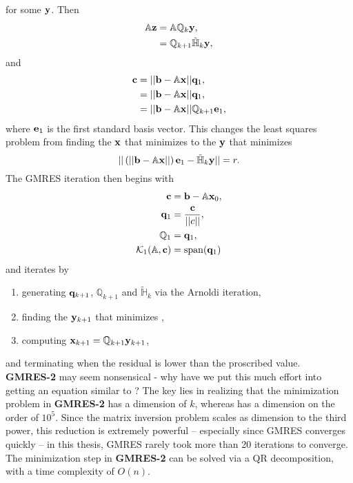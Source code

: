 for some $\mathbf{y}$. Then 
\begin{align}
\begin{split}
\mathbb{A}\mathbf{z} &= \mathbb{A}\mathbb{Q}_{k}\mathbf{y},\\
				&= \mathbb{Q}_{k+1}\mathbb{\tilde{H}}_{k}\mathbf{y},
\end{split}
\end{align}
and
\begin{align} 
\begin{split}
\mathbf{c} &= ||\mathbf{b} - \mathbb{A}\mathbf{x}||\mathbf{q}_1, \\
	&= ||\mathbf{b} - \mathbb{A}\mathbf{x}||\mathbf{q}_1,\\
	&= ||\mathbf{b} - \mathbb{A}\mathbf{x}||\mathbb{Q}_{k+1}\mathbf{e}_1,
\end{split}
\end{align}
where $\mathbf{e}_1$ is the first standard basis vector. This changes the least squares problem from finding the $\mathbf{x}$ that minimizes  to the $\mathbf{y}$ that minimizes
\begin{equation}\label{eq:GMRESMIN}
|| \left ( ||\mathbf{b} - \mathbb{A}\mathbf{x}|| \right )\mathbf{e}_1 - \mathbb{\tilde{H}}_k \mathbf{y} || = r.
\end{equation}
 The GMRES iteration then begins with 
 \begin{align*}
 \mathbf{c} &= \mathbf{b} - \mathbb{A}\mathbf{x}_0,\\
  \mathbf{q}_1 &= \dfrac{\mathbf{c}}{||c||}, \\
  \mathbb{Q}_1 &= \mathbf{q}_1,\\
  \mathcal{K}_1(\mathbb{A},\mathbf{c}) &= \mathrm{span}(\mathbf{q}_1)
  \end{align*} 
  and iterates by
  \begin{enumerate}
  \renewcommand{\labelenumi}{\textbf{\theenumi}}
\renewcommand{\theenumi}{GMRES-\arabic{enumi})}
  \item generating $\mathbf{q}_{k+1}$, $\mathbb{Q}_{k+1}$ and $\mathbb{\tilde{H}}_k$ via the Arnoldi iteration,
  \item finding the $\mathbf{y}_{k+1}$ that minimizes ,
  \item computing $\mathbf{x}_{k+1} = \mathbb{Q}_{k+1}\mathbf{y}_{k+1}$,
  \end{enumerate}
  and terminating when the residual is lower than the proscribed value. \\

 {\bf GMRES-2} may seem nonsensical - why have we put this much effort into getting an equation similar to ? The key lies in realizing that the minimization problem in  {\bf GMRES-2} has a dimension of $k$, whereas  has a dimension on the order of $10^5$. Since the matrix inversion problem scales as dimension to the third power, this reduction is extremely powerful -- especially since GMRES converges quickly -- in this thesis, GMRES rarely took more than 20 iterations to converge. The minimization step in  {\bf GMRES-2} can be solved via a QR decomposition, with a time complexity of $O(n)$.  
 
 
 
 
 
 